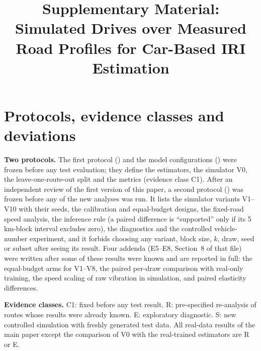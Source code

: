 \documentclass[onecolumn,10pt]{IEEEtran}
\begin{document}
\title{Supplementary Material:\\ Simulated Drives over Measured Road Profiles for Car-Based IRI Estimation}
\maketitle

\section{Protocols, evidence classes and deviations}
\label{sec:s_protocol}
\textbf{Two protocols.}
The first protocol () and the model configurations () were frozen before any test evaluation; they define the estimators, the simulator V0, the leave-one-route-out split and the metrics (evidence class C1).
After an independent review of the first version of this paper, a second protocol () was frozen before any of the new analyses was run.
It lists the simulator variants V1--V10 with their seeds, the calibration and equal-budget designs, the fixed-road speed analysis, the inference rule (a paired difference is ``supported'' only if its 5\,km-block interval excludes zero), the diagnostics and the controlled vehicle-number experiment, and it forbids choosing any variant, block size, $k$, draw, seed or subset after seeing its result.
Four addenda (E5--E8, Section~8 of that file) were written after some of these results were known and are reported in full: the equal-budget arms for V1--V8, the paired per-draw comparison with real-only training, the speed scaling of raw vibration in simulation, and paired elasticity differences.

\textbf{Evidence classes.}
C1: fixed before any test result. R: pre-specified re-analysis of routes whose results were already known. E: exploratory diagnostic. S: new controlled simulation with freshly generated test data.
All real-data results of the main paper except the comparison of V0 with the real-trained estimators are R or E.
\end{document}
